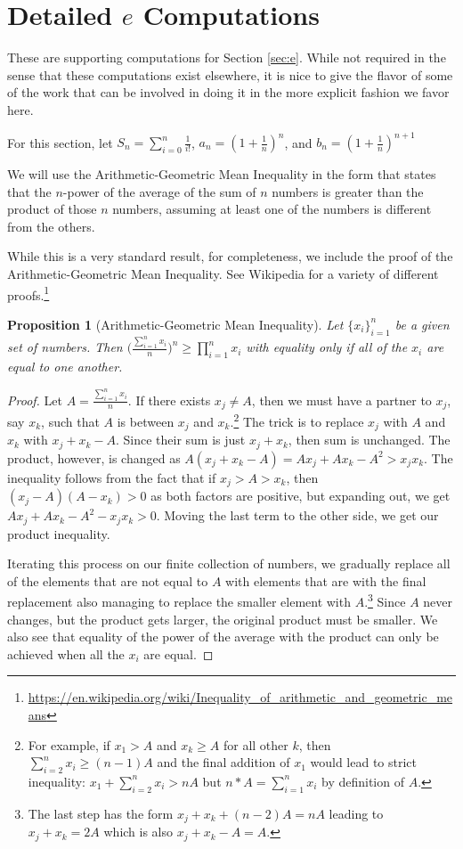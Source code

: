 \documentclass[12pt]{article}
\newtheorem{proposition}{Proposition}[subsection]
\begin{document}
\section{Detailed \texorpdfstring{$e$}{e} Computations}\label{app:e}

These are supporting computations for Section \ref{sec:e}. While not required in the sense that these computations exist elsewhere, it is nice to give the flavor of some of the work that can be involved in doing it in the more explicit fashion we favor here. 

For this section, let $S_n = \sum_{i=0}^n \frac{1}{i!}$, $a_n = (1+\frac{1}{n})^{n}  $, and $b_n = (1+\frac{1}{n})^{n+1}$

We will use the Arithmetic-Geometric Mean Inequality in the form that states that the $n$-power of the average of the sum of $n$ numbers is greater than the product of those $n$ numbers, assuming at least one of the numbers is different from the others. 

While this is a very standard result, for completeness, we include the proof of the Arithmetic-Geometric Mean Inequality. See Wikipedia for a variety of different proofs.\footnote{\url{https://en.wikipedia.org/wiki/Inequality_of_arithmetic_and_geometric_means}}

\begin{proposition}[Arithmetic-Geometric Mean Inequality]
    Let $\{x_i\}_{i=1}^n$ be a given set of numbers. Then $\big(\frac{\sum_{i=1}^n x_i}{n}\big)^n \geq  \prod_{i=1}^n x_i$ with equality only if all of the $x_i$ are equal to one another. 
\end{proposition}

\begin{proof}
    Let $A = \frac{\sum_{i=1}^n x_i}{n}$. If there exists $x_j \neq A$, then we must have a partner to $x_j$, say $x_k$, such that $A$ is between $x_j$ and $x_k$.\footnote{For example, if $x_1 > A$ and $x_k \geq A$ for all other $k$, then $\sum_{i=2}^n x_i \geq (n-1) A$ and the final addition of $x_1$ would lead to strict inequality: $x_1 + \sum_{i=2}^n x_i > n A$ but $n*A = \sum_{i=1}^n x_i$ by definition of $A$.} The trick is to replace $x_j$ with $A$ and $x_k$ with $x_j + x_k - A$. Since their sum is just $x_j + x_k$, then sum is unchanged. The product, however, is changed as $A(x_j + x_k - A) = Ax_j + A x_k - A^2 > x_j x_k$. The inequality follows from the fact that if $x_j > A > x_k$, then $(x_j - A)(A-x_k) > 0$ as both factors are positive, but expanding out, we get $A x_j + Ax_k - A^2 - x_j x_k > 0$. Moving the last term to the other side, we get our product inequality. 

    Iterating this process on our finite collection of numbers, we gradually replace all of the elements that are not equal to $A$ with elements that are with the final replacement also managing to replace the smaller element with $A$.\footnote{The last step has the form $x_j + x_k + (n-2)A = n A$ leading to $x_j +x_k = 2A$ which is also $x_j + x_k - A = A$.} Since $A$ never changes, but the product gets larger, the original product must be smaller. We also see that equality of the power of the average with the product can only be achieved when all the $x_i$ are equal.  
\end{proof}
\end{document}
